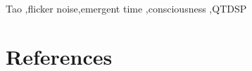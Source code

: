 \documentclass[review]{elsarticle}
\begin{document}



\begin{keyword}
Tao \sep flicker noise\sep emergent time \sep consciousness \sep QTDSP
\end{keyword}

\maketitle

\linenumbers






\section*{References}

\end{document}
